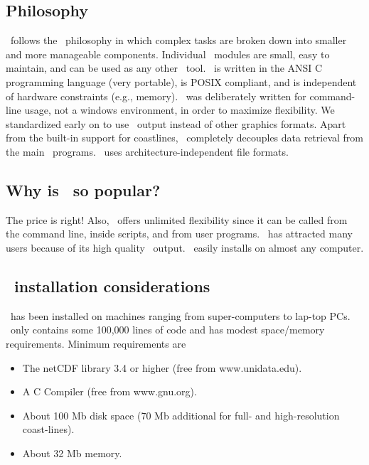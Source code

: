 \documentclass{report}
\begin{document}
\subsection*{Philosophy}

\GMT\ follows the \UNIX\ philosophy in which complex tasks are broken
down into smaller and more manageable components.  Individual \GMT\
modules are small, easy to maintain, and can be used as any other
\UNIX\ tool.  \GMT\ is written in the ANSI C programming language
(very portable), is POSIX compliant, and is independent of
hardware constraints (e.g., memory).  \GMT\ was deliberately written
for command-line usage, not a windows environment, in order to
maximize flexibility.  We standardized early on to use \PS\ output
instead of other graphics formats.  Apart from the built-in support for
coastlines, \GMT\ completely decouples data retrieval from the main
\GMT\ programs.  \GMT\ uses architecture-independent file formats.

\subsection*{Why is \gmt\ so popular?}

The price is right!  Also, \GMT\ offers unlimited flexibility since
it can be called from the command line, inside scripts, and from user
programs.  \GMT\ has attracted many users because of its high quality
\PS\ output.  \GMT\ easily installs on almost any computer.

\subsection*{\gmt\ installation considerations}
\index{GMT@\GMT!installation}

\GMT\ has been installed on machines ranging from super-computers
to lap-top PCs.  \GMT\ only contains some 100,000 lines of code and
has modest space/memory requirements.  Minimum requirements are

\begin{itemize}

\item The netCDF library 3.4 or higher (free from www.unidata.edu).
\item A C Compiler (free from www.gnu.org).
\item About 100 Mb disk space (70 Mb additional for full- and
high-resolution coast-lines).
\item About 32 Mb memory.

\end{itemize}
\end{document}
